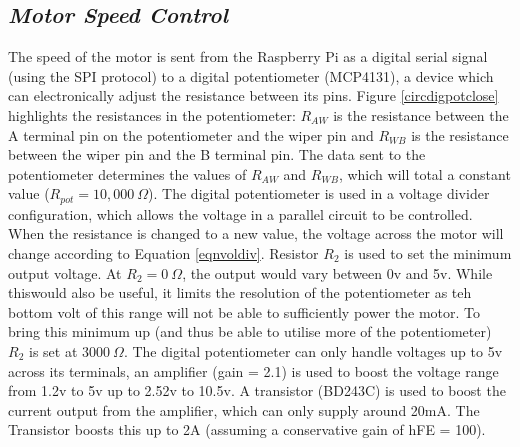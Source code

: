 \documentclass[twoside,a4]{report}
\begin{document}
	\subsection{\textit{Motor Speed Control}} %
	The speed of the motor is sent from the Raspberry Pi as a digital serial signal (using the SPI protocol) to a digital potentiometer (MCP4131), a device which can electronically adjust the resistance between its pins. Figure \ref{circdigpotclose} highlights the resistances in the potentiometer: \(R_{AW}\) is the resistance between the A terminal pin on the potentiometer and the wiper pin and \(R_{WB}\) is the resistance between the wiper pin and the B terminal pin. The data sent to the potentiometer determines the values of \(R_{AW}\) and \(R_{WB}\), which will total a constant value (\(R_{pot} = 10,000\ \Omega \)). The digital potentiometer is used in a voltage divider configuration, which allows the voltage in a parallel circuit to be controlled. When the resistance is changed to a new value, the voltage across the motor will change according to Equation \ref{eqnvoldiv}. Resistor \(R_2\) is used to set the minimum output voltage. At \(R_2 = 0\ \Omega\), the output would vary between 0v and 5v. While thiswould also be useful, it limits the resolution of the potentiometer as teh bottom volt of this range will not be able to sufficiently power the motor. To bring this minimum up (and thus be able to utilise more of the potentiometer) \(R_2\) is set at \(3000\ \Omega \). The digital potentiometer can only handle voltages up to 5v across its terminals, an amplifier (gain = 2.1) is used to boost the voltage range from 1.2v to 5v up to 2.52v to 10.5v. A transistor (BD243C) is used to boost the current output from the amplifier, which can only supply around 20mA. The Transistor boosts this up to 2A (assuming a conservative gain of hFE = 100).
	
\end{document}
